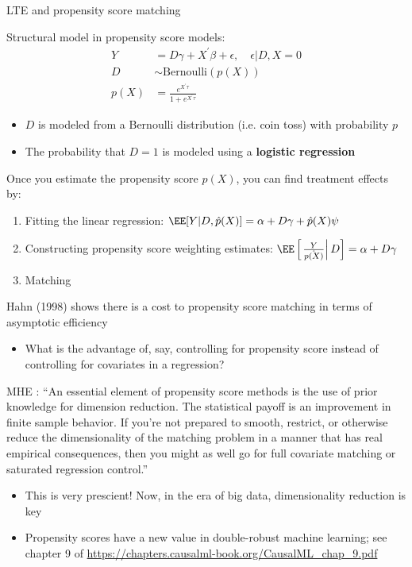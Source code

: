 \documentclass[compress, 8pt]{beamer}
\begin{document}
\begin{frame}{LTE and propensity score matching}

Structural model in propensity score models:
\begin{align*}
    Y &= D \gamma + X^\prime \beta + \epsilon, \quad \epsilon \vert D, X = 0 \\
    D &\sim \text{Bernoulli}\left( p(X) \right) \\
    p(X) &= \frac{e^{X^\prime \tau}}{1 + e^{X^\prime \tau}}
\end{align*}
\begin{itemize}
    \item $D$ is modeled from a Bernoulli distribution (i.e. coin toss) with probability $p$
    \item The probability that $D=1$ is modeled using a \textbf{logistic regression}
\end{itemize}
Once you estimate the propensity score $p(X)$, you can find treatment effects by:
\begin{enumerate}
    \item Fitting the linear regression: $\EE [Y \vert D, \hat{p} (X)] = \alpha + D \gamma + \hat{p}(X) \psi$
    \item Constructing propensity score weighting estimates: $\EE \left[ \left. \frac{Y}{\hat{p(X)}} \right\vert D \right] = \alpha + D \gamma$ 
    \item Matching 
\end{enumerate}

\end{frame}

\begin{frame}{}

Hahn (1998) shows there is a cost to propensity score matching in terms of asymptotic efficiency
\begin{itemize}
    \item What is the advantage of, say, controlling for propensity score instead of controlling for covariates in a regression?
\end{itemize}

\vspace{2ex}
MHE : ``An essential element of  propensity score methods is the use of prior knowledge for dimension reduction. The statistical payoff is an improvement in finite sample behavior. If you're not prepared to smooth, restrict, or otherwise reduce the dimensionality of the matching problem in a manner that has real empirical consequences, then you might as well go for full covariate matching or saturated regression control.''
\begin{itemize}
    \item This is very prescient! Now, in the era of big data, dimensionality reduction is key
    \item Propensity scores have a new value in double-robust machine learning; see chapter 9 of \url{https://chapters.causalml-book.org/CausalML_chap_9.pdf}
\end{itemize}

\end{frame}
\end{document}

